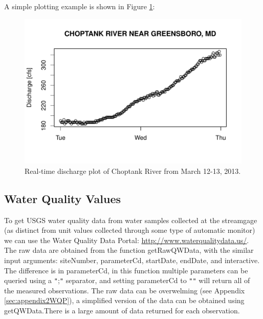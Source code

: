 \documentclass[a4paper,11pt]{article}
\begin{document}
A simple plotting example is shown in Figure \ref{fig:RT}:
\begin{Schunk}
\end{Schunk}
\newpage

\begin{figure}
\begin{center}
\includegraphics{dataRetrieval-fig2}
\end{center}
\caption{Real-time discharge plot of Choptank River from March 12-13, 2013.}
\label{fig:RT}
\end{figure}

\FloatBarrier
\subsection{Water Quality Values}
\label{sec:usgsWQP}
To get USGS water quality data from water samples collected at the streamgage (as distinct from unit values collected through some type of automatic monitor) we can use the Water Quality Data Portal: \url{http://www.waterqualitydata.us/}. The raw data are obtained from the function  getRawQWData, with the similar input arguments: siteNumber, parameterCd, startDate, endDate, and interactive. The difference is in parameterCd, in this function multiple parameters can be queried using a \texttt{"};\texttt{"} separator, and setting parameterCd to \texttt{"}\texttt{"} will return all of the measured observations. The raw data can be overwelming (see Appendix \ref{sec:appendix2WQP}), a simplified version of the data can be obtained using getQWData.There is a large amount of data returned for each observation. 
\end{document}
